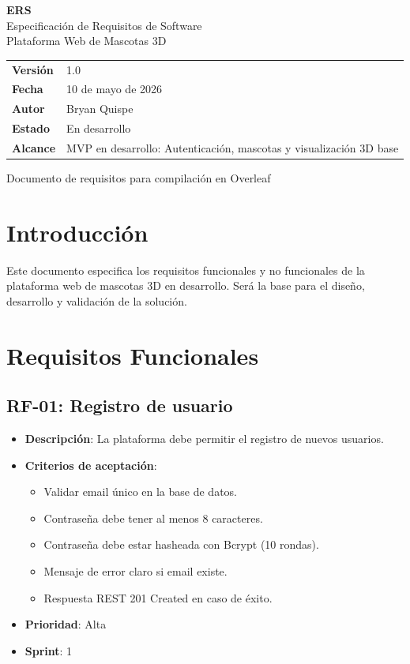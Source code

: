 \documentclass[12pt,a4paper]{article}
\author{Bryan Quispe}
\date{10 de mayo de 2026}
\begin{document}
\begin{titlepage}
\centering
\vspace*{1.8cm}
{\Huge\bfseries\color{PrimaryBlue} ERS\\[0.35em]}
{\LARGE Especificaci\'on de Requisitos de Software\\[0.5em]}
{\large Plataforma Web de Mascotas 3D\\[1.2cm]}

\begin{tabular}{p{5cm} p{8cm}}
\rowcolor{SoftGray}
\textbf{Versi\'on} & 1.0 \\
\textbf{Fecha} & 10 de mayo de 2026 \\
\textbf{Autor} & Bryan Quispe \\
\textbf{Estado} & En desarrollo \\
\textbf{Alcance} & MVP en desarrollo: Autenticaci\'on, mascotas y visualizaci\'on 3D base \\
\end{tabular}

\vfill
{\large Documento de requisitos para compilaci\'on en Overleaf}
\end{titlepage}

\tableofcontents
\newpage

\section{Introducci\'on}
Este documento especifica los requisitos funcionales y no funcionales de la plataforma web de mascotas 3D en desarrollo. Ser\'a la base para el dise\~no, desarrollo y validaci\'on de la soluci\'on.

\section{Requisitos Funcionales}

\subsection{RF-01: Registro de usuario}
\begin{itemize}[leftmargin=*]
    \item \textbf{Descripci\'on}: La plataforma debe permitir el registro de nuevos usuarios.
    \item \textbf{Criterios de aceptaci\'on}:
    \begin{itemize}[leftmargin=*]
        \item Validar email \'unico en la base de datos.
        \item Contrase\~na debe tener al menos 8 caracteres.
        \item Contrase\~na debe estar hasheada con Bcrypt (10 rondas).
        \item Mensaje de error claro si email existe.
        \item Respuesta REST 201 Created en caso de \'exito.
    \end{itemize}
    \item \textbf{Prioridad}: Alta
    \item \textbf{Sprint}: 1
\end{itemize}
\end{document}

